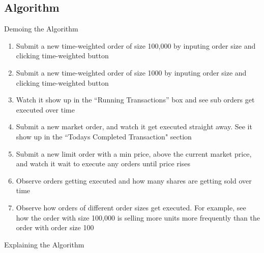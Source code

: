 \documentclass{article}
\begin{document}
\subsection{Algorithm}
Demoing the Algorithm
\begin{enumerate}
\item Submit a new time-weighted order of size 100,000 by inputing order size and clicking time-weighted button
\item Submit a new time-weighted order of size 1000 by inputing order size and clicking time-weighted button
\item Watch it show up in the ``Running Transactions'' box and see sub orders get executed over time
\item Submit a new market order, and watch it get executed straight away. See it show up in the ``Todays Completed Transaction" section
\item Submit a new limit order with a min price, above the current market price, and watch it wait to execute any orders until price rises
\item Observe orders getting executed and how many shares are getting sold over time
\item Observe how orders of different order sizes get executed. For example, see how the order with size 100,000 is selling more units more frequently than the order with order size 100
\end{enumerate}
Explaining the Algorithm
\end{document}
